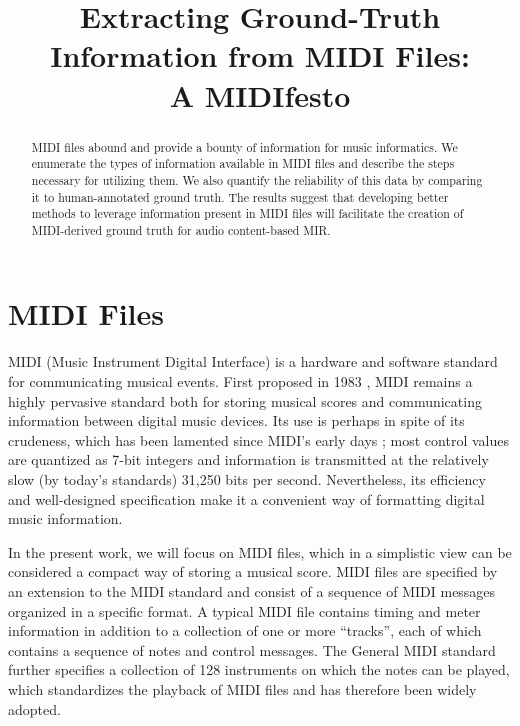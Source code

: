 \documentclass{article}
\title{Extracting Ground-Truth Information from MIDI Files:\\A MIDIfesto}
\begin{document}
\maketitle

\begin{abstract}
MIDI files abound and provide a bounty of information for music informatics.
We enumerate the types of information available in MIDI files and describe the steps necessary for utilizing them.
We also quantify the reliability of this data by comparing it to human-annotated ground truth.
The results suggest that developing better methods to leverage information present in MIDI files will facilitate the creation of MIDI-derived ground truth for audio content-based MIR.
\end{abstract}

\section{MIDI Files}\label{sec:introduction}

MIDI (Music Instrument Digital Interface) is a hardware and software standard for communicating musical events.
First proposed in 1983 \cite{international1983midi}, MIDI remains a highly pervasive standard both for storing musical scores and communicating information between digital music devices.
Its use is perhaps in spite of its crudeness, which has been lamented since MIDI's early days \cite{moore1988dysfunctions}; most control values are quantized as 7-bit integers and information is transmitted at the relatively slow (by today's standards) 31,250 bits per second.
Nevertheless, its efficiency and well-designed specification make it a convenient way of formatting digital music information.

In the present work, we will focus on MIDI files, which in a simplistic view can be considered a compact way of storing a musical score.
MIDI files are specified by an extension to the MIDI standard \cite{international1988standard} and consist of a sequence of MIDI messages organized in a specific format.
A typical MIDI file contains timing and meter information in addition to a collection of one or more ``tracks'', each of which contains a sequence of notes and control messages.
The General MIDI standard \cite{international1991general} further specifies a collection of 128 instruments on which the notes can be played, which standardizes the playback of MIDI files and has therefore been widely adopted.
\end{document}
